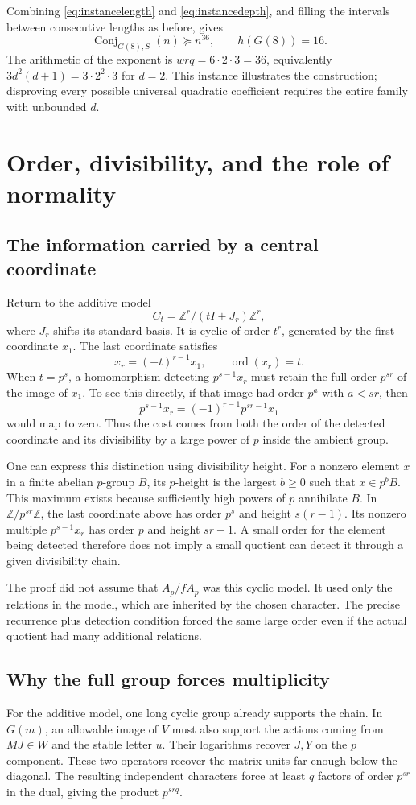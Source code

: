 \documentclass[11pt]{article}
\numberwithin{equation}{section}
\theoremstyle{definition}
\theoremstyle{remark}
\newcommand{\Z}{\mathbb Z}
\newcommand{\Conj}{\operatorname{Conj}}
\newcommand{\ord}{\operatorname{ord}}
\begin{document}
Combining \eqref{eq:instancelength} and \eqref{eq:instancedepth}, and filling the intervals between consecutive lengths as before, gives
\[
\Conj_{G(8),S}(n)\succeq n^{36},\qquad h(G(8))=16.
\]
The arithmetic of the exponent is $w r q=6\cdot2\cdot3=36$, equivalently $3d^2(d+1)=3\cdot2^2\cdot3$ for $d=2$. This instance illustrates the construction; disproving every possible universal quadratic coefficient requires the entire family with unbounded $d$.

\section{Order, divisibility, and the role of normality}\label{sec:interpretation}
\subsection{The information carried by a central coordinate}
Return to the additive model
\[
C_t=\Z^r/(tI+J_r)\Z^r,
\]
where $J_r$ shifts its standard basis. It is cyclic of order $t^r$, generated by the first coordinate $x_1$. The last coordinate satisfies
\[
x_r=(-t)^{r-1}x_1,\qquad \ord(x_r)=t.
\]
When $t=p^s$, a homomorphism detecting $p^{s-1}x_r$ must retain the full order $p^{sr}$ of the image of $x_1$. To see this directly, if that image had order $p^a$ with $a<sr$, then
\[
p^{s-1}x_r=(-1)^{r-1}p^{sr-1}x_1
\]
would map to zero. Thus the cost comes from both the order of the detected coordinate and its divisibility by a large power of $p$ inside the ambient group.

One can express this distinction using divisibility height. For a nonzero element $x$ in a finite abelian $p$-group $B$, its $p$-height is the largest $b\ge0$ such that $x\in p^bB$. This maximum exists because sufficiently high powers of $p$ annihilate $B$. In $\Z/p^{sr}\Z$, the last coordinate above has order $p^s$ and height $s(r-1)$. Its nonzero multiple $p^{s-1}x_r$ has order $p$ and height $sr-1$. A small order for the element being detected therefore does not imply a small quotient can detect it through a given divisibility chain.

The proof did not assume that $A_p/fA_p$ was this cyclic model. It used only the relations in the model, which are inherited by the chosen character. The precise recurrence plus detection condition forced the same large order even if the actual quotient had many additional relations.

\subsection{Why the full group forces multiplicity}
For the additive model, one long cyclic group already supports the chain. In $G(m)$, an allowable image of $V$ must also support the actions coming from $MJ\in W$ and the stable letter $u$. Their logarithms recover $J,Y$ on the $p$ component. These two operators recover the matrix units far enough below the diagonal. The resulting independent characters force at least $q$ factors of order $p^{sr}$ in the dual, giving the product $p^{srq}$.
\end{document}
